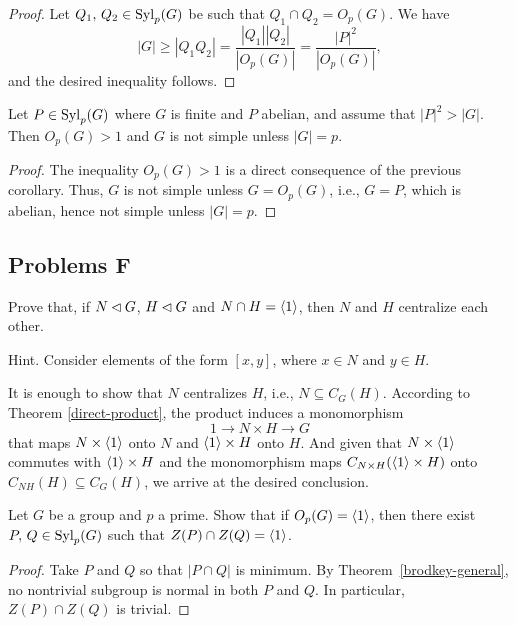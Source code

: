 \begin{proof} Let $Q_1,\,Q_2\in{\rm Syl}_p(G)$ be such that $Q_1\cap Q_2=O_p(G)$. We have
$$
    |G| \ge |Q_1Q_2|=\frac{|Q_1||Q_2|}{|O_p(G)|}=\frac{|P|^2}{|O_p(G)|},
$$
and the desired inequality follows.  \end{proof}

\begin{cor}
    Let\/ $P\in{\rm Syl}_p(G)$ where\/ $G$ is finite and\/ $P$ abelian, and assume that $|P|^2>|G|$. Then $O_p(G)>1$ and\/ $G$ is not simple unless $|G|=p$.
\end{cor}

\begin{proof} The inequality $O_p(G)>1$ is a direct consequence of the previous corollary. Thus, $G$ is not simple unless $G=O_p(G)$, i.e., $G=P$, which is abelian, hence not simple unless $|G|=p$.  \end{proof}

\subsection{Problems F}

\begin{probl}\label{problem-1.F.1}
    Prove that, if\/ $N\lhd G$, $H\lhd G$ and\/ $N\cap H=\langle1\rangle$, then\/ $N$ and\/ $H$ centralize each other.

    \textrm{\upshape Hint. Consider elements of the form $[x,y]$, where $x\in N$ and $y\in H$.}
\end{probl}

\begin{solution} It is enough to show that $N$ centralizes $H$, i.e., $N\subseteq C_G(H)$. According to Theorem \ref{direct-product}, the product induces a monomorphism
$$
    1\to N\times H\to G
$$
that maps $N\times\langle1\rangle$ onto $N$ and $\langle1\rangle\times H$ onto $H$. And given that $N\times\langle1\rangle$ commutes with $\langle1\rangle\times H$ and the monomorphism maps $C_{N\times H}(\langle1\rangle\times H)$ onto $C_{NH}(H)\subseteq C_G(H)$, we arrive at the desired conclusion.  \end{solution}

\begin{probl}
    Let\/ $G$ be a group and\/ $p$ a prime. Show that if\/ $O_{p}(G)=\langle1\rangle$, then there exist $P,\,Q \in{\rm Syl}_{p}(G)$ such that $Z(P)\cap Z(Q)=\langle1\rangle$.
\end{probl}

\begin{proof} Take $P$ and $Q$ so that $|P\cap Q|$ is minimum. By Theorem~\ref{brodkey-general}, no nontrivial subgroup is normal in both $P$ and $Q$. In particular, $Z(P)\cap Z(Q)$ is trivial.  \end{proof}

